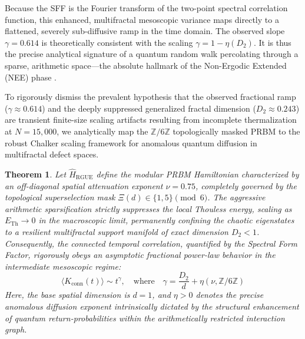 \documentclass[aps,prl,preprint,superscriptaddress,floatfix]{revtex4-2}
\newtheorem{theorem}{Theorem}[section]
\newcommand{\Zmod}{\mathbb{Z}/6\mathbb{Z}}
\begin{document}
Because the SFF is the Fourier transform of the two-point spectral correlation function, this enhanced, multifractal mesoscopic variance maps directly to a flattened, severely sub-diffusive ramp in the time domain. The observed slope $\gamma = 0.614$ is theoretically consistent with the scaling $\gamma = 1 - \eta(D_2)$. It is thus the precise analytical signature of a quantum random walk percolating through a sparse, arithmetic space—the absolute hallmark of the Non-Ergodic Extended (NEE) phase \cite{Kravtsov2015, Khaymovich2020, GarciaGarcia2024}.

To rigorously dismiss the prevalent hypothesis that the observed fractional ramp ($\gamma \approx 0.614$) and the deeply suppressed generalized fractal dimension ($D_2 \approx 0.243$) are transient finite-size scaling artifacts resulting from incomplete thermalization at $N=15,000$, we analytically map the $\Zmod$ topologically masked PRBM to the robust Chalker scaling framework for anomalous quantum diffusion in multifractal defect spaces.

\begin{theorem}
\label{thm:anomalous_diffusion_sff}
Let $\hat{H}_{\text{RGUE}}$ define the modular PRBM Hamiltonian characterized by an off-diagonal spatial attenuation exponent $\nu = 0.75$, completely governed by the topological superselection mask $\Xi(d) \in \{1,5\} \pmod 6$. The aggressive arithmetic sparsification strictly suppresses the local Thouless energy, scaling as $E_{\text{Th}} \to 0$ in the macroscopic limit, permanently confining the chaotic eigenstates to a resilient multifractal support manifold of exact dimension $D_2 < 1$. Consequently, the connected temporal correlation, quantified by the Spectral Form Factor, rigorously obeys an asymptotic fractional power-law behavior in the intermediate mesoscopic regime:
\begin{equation}
\langle K_{\text{conn}}(t) \rangle \sim t^{\gamma}, \quad \text{where} \quad \gamma = \frac{D_2}{d} + \eta(\nu, \Zmod)
\end{equation}
Here, the base spatial dimension is $d=1$, and $\eta > 0$ denotes the precise anomalous diffusion exponent intrinsically dictated by the structural enhancement of quantum return-probabilities within the arithmetically restricted interaction graph.
\end{theorem}
\end{document}
